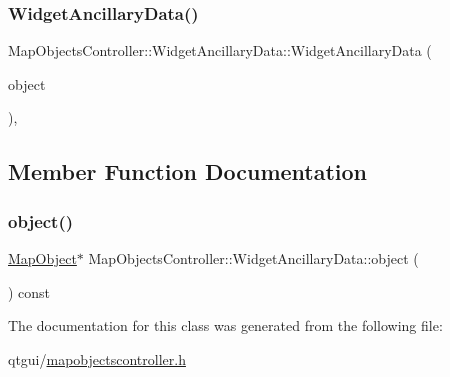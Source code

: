 \subsubsection{\texorpdfstring{WidgetAncillaryData()}{WidgetAncillaryData()}}
{\footnotesize\ttfamily Map\+Objects\+Controller\+::\+Widget\+Ancillary\+Data\+::\+Widget\+Ancillary\+Data (\begin{DoxyParamCaption}\item[{\mbox{\hyperlink{class_map_object}{Map\+Object}} $\ast$}]{object }\end{DoxyParamCaption})\hspace{0.3cm}{\ttfamily [inline]}, {\ttfamily [explicit]}}



\subsection{Member Function Documentation}
\mbox{\label{class_map_objects_controller_1_1_widget_ancillary_data_a78ab42237f6cd5c9e40cdb81f55a70f9}} 
\subsubsection{\texorpdfstring{object()}{object()}}
{\footnotesize\ttfamily \mbox{\hyperlink{class_map_object}{Map\+Object}}$\ast$ Map\+Objects\+Controller\+::\+Widget\+Ancillary\+Data\+::object (\begin{DoxyParamCaption}{ }\end{DoxyParamCaption}) const\hspace{0.3cm}{\ttfamily [inline]}}



The documentation for this class was generated from the following file\+:\begin{DoxyCompactItemize}
\item 
qtgui/\mbox{\hyperlink{mapobjectscontroller_8h}{mapobjectscontroller.\+h}}\end{DoxyCompactItemize}
